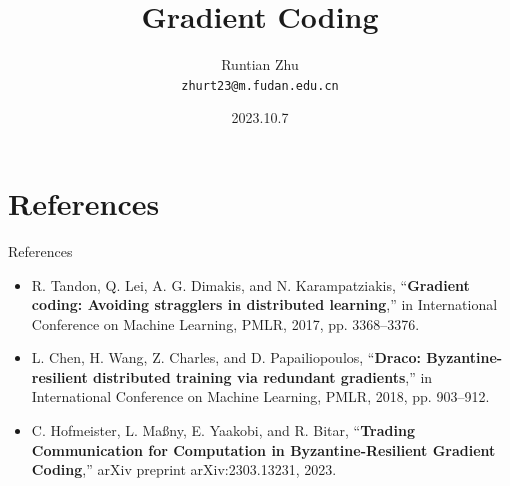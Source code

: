 \documentclass{beamer}
\title{Gradient Coding}
\author{Runtian Zhu \\ \texttt{zhurt23@m.fudan.edu.cn}}
\date{2023.10.7}
\begin{document}
\captionsetup[figure]{labelformat=empty}

\begin{frame}
  \titlepage
\end{frame}


\section{References}

\begin{frame}{References}

\begin{itemize}
    \item R. Tandon, Q. Lei, A. G. Dimakis, and N. Karampatziakis, “\textbf{Gradient coding: Avoiding stragglers in distributed learning},” in International Conference on Machine Learning, PMLR, 2017, pp. 3368–3376.
    \item L. Chen, H. Wang, Z. Charles, and D. Papailiopoulos, “\textbf{Draco: Byzantine-resilient distributed training via redundant gradients},” in International Conference on Machine Learning, PMLR, 2018, pp. 903–912.
    \item C. Hofmeister, L. Maßny, E. Yaakobi, and R. Bitar, “\textbf{Trading Communication for Computation in Byzantine-Resilient Gradient Coding},” arXiv preprint arXiv:2303.13231, 2023.
    
\end{itemize}


\end{frame}
\end{document}
